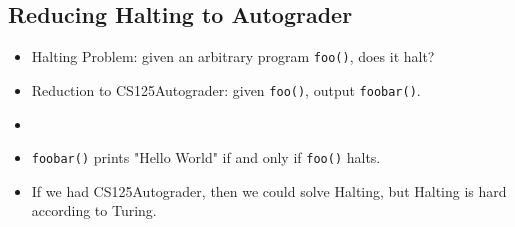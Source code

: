 \documentclass[12pt]{article}
\begin{document}
\subsection{Reducing Halting to Autograder}
\begin{itemize}
    \item Halting Problem: given an arbitrary program \texttt{foo()}, does it halt?
    \item Reduction to CS125Autograder: given \texttt{foo()}, output \texttt{foobar()}.
    \item[] 
    \item \texttt{foobar()} prints "Hello World" if and only if \texttt{foo()} halts.
    \item If we had CS125Autograder, then we could solve Halting, but Halting is hard according to Turing.
\end{itemize}
\end{document}
